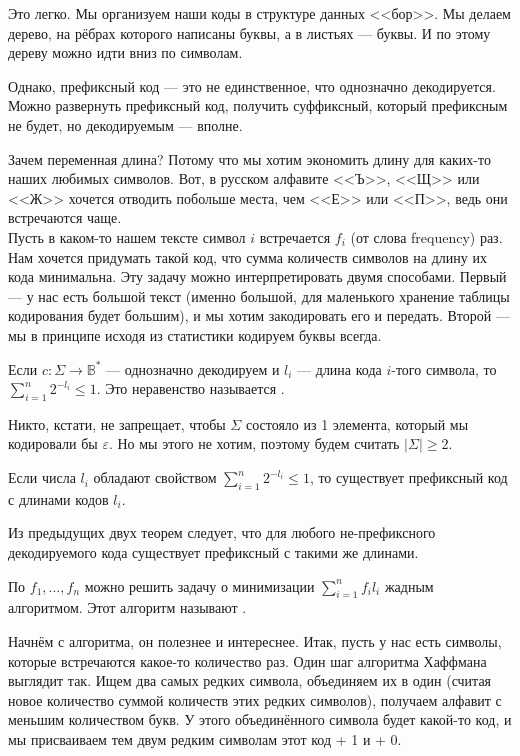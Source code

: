 \documentclass{article}
\begin{document}
\begin{itemize}
        \begin{Proof}
            Это легко. Мы организуем наши коды в структуре данных <<бор>>. Мы делаем дерево, на рёбрах которого написаны буквы, а в листьях --- буквы. И по этому дереву можно идти вниз по символам.
        \end{Proof}
        \thm Однако, префиксный код --- это не единственное, что однозначно декодируется. Можно развернуть префиксный код, получить суффиксный, который префиксным не будет, но декодируемым --- вполне.
        \begin{Comment}
            Зачем переменная длина? Потому что мы хотим экономить длину для каких-то наших любимых символов. Вот, в русском алфавите <<Ъ>>, <<Щ>> или <<Ж>> хочется отводить побольше места, чем <<Е>> или <<П>>, ведь они встречаются чаще.\\
            Пусть в каком-то нашем тексте символ $i$ встречается $f_i$ (от слова frequency) раз. Нам хочется придумать такой код, что сумма количеств символов на длину их кода минимальна. Эту задачу можно интерпретировать двумя способами. Первый --- у нас есть большой текст (именно большой, для маленького хранение таблицы кодирования будет большим), и мы хотим закодировать его и передать. Второй --- мы в принципе исходя из статистики кодируем буквы всегда.
        \end{Comment}
        \thm Если $c\colon\Sigma\to\mathbb B^*$ --- однозначно декодируем и $l_i$ --- длина кода $i$-того символа, то $\sum_{i=1}^n2^{-l_i}\leqslant1$.
        \dfn Это неравенство называется .
        \begin{Comment}
            Никто, кстати, не запрещает, чтобы $\Sigma$ состояло из 1 элемента, который мы кодировали бы $\varepsilon$. Но мы этого не хотим, поэтому будем считать $|\Sigma|\geqslant2$.
        \end{Comment}
        \thm Если числа $l_i$ обладают свойством $\sum_{i=1}^n2^{-l_i}\leqslant1$, то существует префиксный код с длинами кодов $l_i$.
        \begin{Comment}
            Из предыдущих двух теорем следует, что для любого не-префиксного декодируемого кода существует префиксный с такими же длинами.
        \end{Comment}
        \thm По $f_1,\ldots,f_n$ можно решить задачу о минимизации $\sum_{i=1}^nf_il_i$ жадным алгоритмом.
        \dfn Этот алгоритм называют .
        \begin{Proof}
            Начнём с алгоритма, он полезнее и интереснее. Итак, пусть у нас есть символы, которые встречаются какое-то количество раз. Один шаг алгоритма Хаффмана выглядит так. Ищем два самых редких символа, объединяем их в один (считая новое количество суммой количеств этих редких символов), получаем алфавит с меньшим количеством букв. У этого объединённого символа будет какой-то код, и мы присваиваем тем двум редким символам этот код + 1 и + 0.\\

\end{Proof}
\end{itemize}
\end{document}
